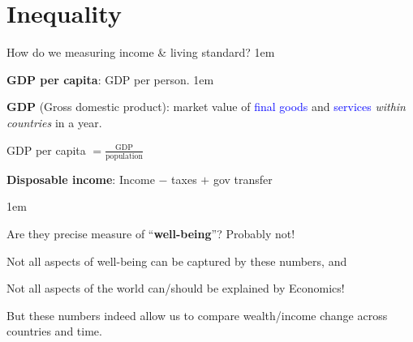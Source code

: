 \documentclass[11pt,aspectratio=43,usenames,dvipsnames]{beamer}
\newcommand{\blue}[1]{\textcolor{blue}{#1}}
\let\olditemize=\itemize
\let\endolditemize=\enditemize
\renewenvironment{itemize}{\olditemize \itemsep1em}{\endolditemize}
\let\oldenumerate=\enumerate
\let\endoldenumerate=\endenumerate
\renewenvironment{enumerate}{\oldenumerate \itemsep1em}{ \endoldenumerate}
\theoremstyle{definition}
\begin{document}
\section{Inequality}
\label{sec:Inequality}

\begin{frame}{How do we measuring income \& living standard?}
\label{slide:How_do_we_measuring_income____living_standard_}
    \begin{enumerate}
        \item \textbf{GDP per capita}: GDP per person.
        \begin{itemize}
            \item \textbf{GDP} (Gross domestic product): market value of \blue{final goods} and \blue{services} \textit{within countries} in a year.
            \item GDP per capita $ = \frac{\text{GDP}}{\text{population}} $
        \end{itemize}
        \item \textbf{Disposable income}: Income $ -  $ taxes $ + $ gov transfer
    \end{enumerate}

    \vspace{1em}

    \begin{itemize}
        \item Are they precise measure of ``\textbf{well-being}''? Probably not!
        \item Not all aspects of well-being can be captured by these numbers, and
        \item Not all aspects of the world can/should be explained by Economics!
        \item But these numbers indeed allow us to compare wealth/income change across countries and time.
    \end{itemize}

\end{frame}
\end{document}
